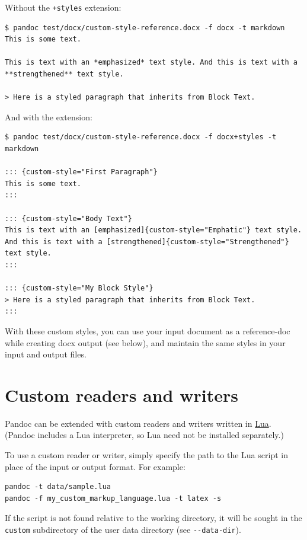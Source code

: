 \documentclass[
  b5paper
]{book}
\begin{document}
Without the \texttt{+styles} extension:

\begin{verbatim}
$ pandoc test/docx/custom-style-reference.docx -f docx -t markdown
This is some text.

This is text with an *emphasized* text style. And this is text with a
**strengthened** text style.

> Here is a styled paragraph that inherits from Block Text.
\end{verbatim}

And with the extension:

\begin{verbatim}
$ pandoc test/docx/custom-style-reference.docx -f docx+styles -t markdown

::: {custom-style="First Paragraph"}
This is some text.
:::

::: {custom-style="Body Text"}
This is text with an [emphasized]{custom-style="Emphatic"} text style.
And this is text with a [strengthened]{custom-style="Strengthened"}
text style.
:::

::: {custom-style="My Block Style"}
> Here is a styled paragraph that inherits from Block Text.
:::
\end{verbatim}

With these custom styles, you can use your input document as a
reference-doc while creating docx output (see below), and maintain the
same styles in your input and output files.

\chapter{Custom readers and writers}\label{custom-readers-and-writers}

Pandoc can be extended with custom readers and writers written in
\href{https://www.lua.org}{Lua}. (Pandoc includes a Lua interpreter, so
Lua need not be installed separately.)

To use a custom reader or writer, simply specify the path to the Lua
script in place of the input or output format. For example:

\begin{verbatim}
pandoc -t data/sample.lua
pandoc -f my_custom_markup_language.lua -t latex -s
\end{verbatim}

If the script is not found relative to the working directory, it will be
sought in the \texttt{custom} subdirectory of the user data directory
(see \texttt{-\/-data-dir}).
\end{document}

